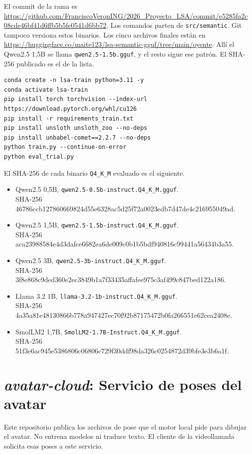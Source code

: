 El commit de la rama es \url{https://github.com/FranciscoVeronING/2026_Proyecto_LSA/commit/e5285fa2c08cde46bf41d6ffb5b5fe0541d6bb72}. Los comandos parten de \texttt{src/semantic}. Git tampoco versiona estos binarios. Los cinco archivos finales están en \url{https://huggingface.co/maite123/lsa-semantic-gguf/tree/main/oyente}. Allí el Qwen2.5 1,5B se llama \texttt{qwen2.5-1.5b.gguf}, y el resto sigue ese patrón. El SHA-256 publicado es el de la lista.

\begin{lstlisting}
conda create -n lsa-train python=3.11 -y
conda activate lsa-train
pip install torch torchvision --index-url https://download.pytorch.org/whl/cu126
pip install -r requirements_train.txt
pip install unsloth unsloth_zoo --no-deps
pip install unbabel-comet==2.2.7 --no-deps
python train.py --continue-on-error
python eval_trial.py
\end{lstlisting}

El SHA-256 de cada binario \texttt{Q4\_K\_M} evaluado es el siguiente.
\begin{itemize}
    \item Qwen2.5 0,5B, \texttt{qwen2.5-0.5b-instruct.Q4\_K\_M.gguf}.\\
SHA-256 {\ttfamily\small  46786ccb127860669824d55e6328ac5d\allowbreak 25f72a0023edb7d47de4c216955049ad}.
    \item Qwen2.5 1,5B, \texttt{qwen2.5-1.5b-instruct.Q4\_K\_M.gguf}.\\
SHA-256 {\ttfamily\small  aca23988584e4d3dafce6682ea6de009\allowbreak c0b1b5bdf940816c99441a56434b3a55}.
    \item Qwen2.5 3B, \texttt{qwen2.5-3b-instruct.Q4\_K\_M.gguf}.\\
SHA-256 {\ttfamily\small  3f8e868c9ded360e2ec3849b1a7f3343\allowbreak 5affafee975c3af499c847bed122a186}.
    \item Llama 3.2 1B, \texttt{llama-3.2-1b-instruct.Q4\_K\_M.gguf}.\\
SHA-256 {\ttfamily\small  4a35a81e48130866b778a947427ec70f\allowbreak 92b87175472b0fa266551e62cea2408e}.
    \item SmolLM2 1,7B, \texttt{SmolLM2-1.7B-Instruct.Q4\_K\_M.gguf}.\\
SHA-256 {\ttfamily\small  51f3e6ac945e5386806c06806c729f30\allowbreak ddf98da326c0254872d39bfe3e3b6a1f}.
\end{itemize}

\section{\textit{avatar-cloud}: Servicio de poses del avatar}
Este repositorio publica los archivos de pose que el motor local pide para dibujar el avatar. No entrena modelos ni traduce texto. El cliente de la videollamada solicita esas poses a este servicio.

